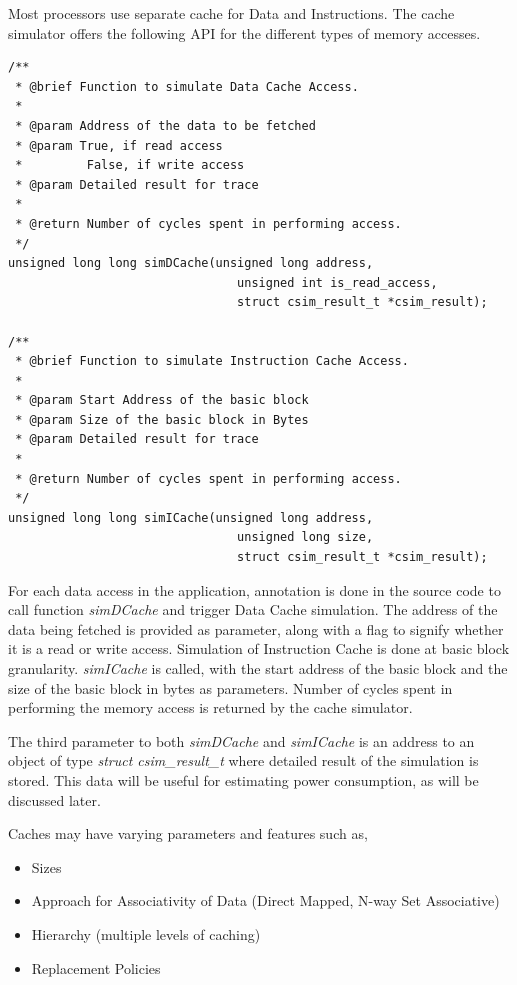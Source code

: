 Most processors use separate cache for Data and Instructions. The cache simulator offers the following API for the different types of memory accesses.

\begin{lstlisting}[numbers=none, frame=none]
/**
 * @brief Function to simulate Data Cache Access.
 *
 * @param Address of the data to be fetched
 * @param True, if read access
 *         False, if write access
 * @param Detailed result for trace
 *
 * @return Number of cycles spent in performing access.
 */
unsigned long long simDCache(unsigned long address,
                                unsigned int is_read_access,
                                struct csim_result_t *csim_result);
                                
/**
 * @brief Function to simulate Instruction Cache Access.
 *
 * @param Start Address of the basic block
 * @param Size of the basic block in Bytes
 * @param Detailed result for trace 
 *
 * @return Number of cycles spent in performing access.
 */
unsigned long long simICache(unsigned long address,
                                unsigned long size,
                                struct csim_result_t *csim_result);
\end{lstlisting}

For each data access in the application, annotation is done in the source code to call function \emph{simDCache} and trigger Data Cache simulation. The address of the data being fetched is provided as parameter, along with a flag to signify whether it is a read or write access. Simulation of Instruction Cache is done at basic block granularity. \emph{simICache} is called, with the start address of the basic block and the size of the basic block in bytes as parameters. Number of cycles spent in performing the memory access is returned by the cache simulator.

The third parameter to both \emph{simDCache} and \emph{simICache} is an address to an object of type \emph{struct csim\_result\_t} where detailed result of the simulation is stored. This data will be useful for estimating power consumption, as will be discussed later.

Caches may have varying parameters and features such as,
\begin{itemize} \itemsep -6pt
\item Sizes
\item Approach for Associativity of Data (Direct Mapped, N-way Set Associative)
\item Hierarchy (multiple levels of caching)
\item Replacement Policies
\end{itemize}

